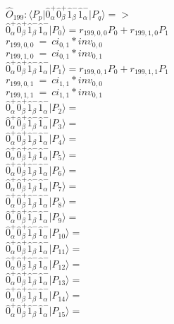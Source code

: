 \documentclass[14pt]{article}
\begin{document}
    $\hat{O}_{199}:  \langle{P_p}\vert \hat{0}_{\alpha}^{+}\hat{0}_{\beta}^{+}\hat{1}_{\beta}^{-}\hat{1}_{\alpha}^{-} \vert{P_q}\rangle => $ \\ 
    $ \hat{0}_{\alpha}^{+}\hat{0}_{\beta}^{+}\hat{1}_{\beta}^{-}\hat{1}_{\alpha}^{-} \vert{P_{0}}\rangle = {r}_{199,0,0}P_{0}+{r}_{199,1,0}P_{1} $ \\ 
    ${r}_{199,0,0}\ =\ {ci}_{0,1}*{inv}_{0,0} $ \\ 
    ${r}_{199,1,0}\ =\ {ci}_{0,1}*{inv}_{0,1} $ \\ 
    $ \hat{0}_{\alpha}^{+}\hat{0}_{\beta}^{+}\hat{1}_{\beta}^{-}\hat{1}_{\alpha}^{-} \vert{P_{1}}\rangle = {r}_{199,0,1}P_{0}+{r}_{199,1,1}P_{1} $ \\ 
    ${r}_{199,0,1}\ =\ {ci}_{1,1}*{inv}_{0,0} $ \\ 
    ${r}_{199,1,1}\ =\ {ci}_{1,1}*{inv}_{0,1} $ \\ 
    $ \hat{0}_{\alpha}^{+}\hat{0}_{\beta}^{+}\hat{1}_{\beta}^{-}\hat{1}_{\alpha}^{-} \vert{P_{2}}\rangle =  $ \\ 
    $ \hat{0}_{\alpha}^{+}\hat{0}_{\beta}^{+}\hat{1}_{\beta}^{-}\hat{1}_{\alpha}^{-} \vert{P_{3}}\rangle =  $ \\ 
    $ \hat{0}_{\alpha}^{+}\hat{0}_{\beta}^{+}\hat{1}_{\beta}^{-}\hat{1}_{\alpha}^{-} \vert{P_{4}}\rangle =  $ \\ 
    $ \hat{0}_{\alpha}^{+}\hat{0}_{\beta}^{+}\hat{1}_{\beta}^{-}\hat{1}_{\alpha}^{-} \vert{P_{5}}\rangle =  $ \\ 
    $ \hat{0}_{\alpha}^{+}\hat{0}_{\beta}^{+}\hat{1}_{\beta}^{-}\hat{1}_{\alpha}^{-} \vert{P_{6}}\rangle =  $ \\ 
    $ \hat{0}_{\alpha}^{+}\hat{0}_{\beta}^{+}\hat{1}_{\beta}^{-}\hat{1}_{\alpha}^{-} \vert{P_{7}}\rangle =  $ \\ 
    $ \hat{0}_{\alpha}^{+}\hat{0}_{\beta}^{+}\hat{1}_{\beta}^{-}\hat{1}_{\alpha}^{-} \vert{P_{8}}\rangle =  $ \\ 
    $ \hat{0}_{\alpha}^{+}\hat{0}_{\beta}^{+}\hat{1}_{\beta}^{-}\hat{1}_{\alpha}^{-} \vert{P_{9}}\rangle =  $ \\ 
    $ \hat{0}_{\alpha}^{+}\hat{0}_{\beta}^{+}\hat{1}_{\beta}^{-}\hat{1}_{\alpha}^{-} \vert{P_{10}}\rangle =  $ \\ 
    $ \hat{0}_{\alpha}^{+}\hat{0}_{\beta}^{+}\hat{1}_{\beta}^{-}\hat{1}_{\alpha}^{-} \vert{P_{11}}\rangle =  $ \\ 
    $ \hat{0}_{\alpha}^{+}\hat{0}_{\beta}^{+}\hat{1}_{\beta}^{-}\hat{1}_{\alpha}^{-} \vert{P_{12}}\rangle =  $ \\ 
    $ \hat{0}_{\alpha}^{+}\hat{0}_{\beta}^{+}\hat{1}_{\beta}^{-}\hat{1}_{\alpha}^{-} \vert{P_{13}}\rangle =  $ \\ 
    $ \hat{0}_{\alpha}^{+}\hat{0}_{\beta}^{+}\hat{1}_{\beta}^{-}\hat{1}_{\alpha}^{-} \vert{P_{14}}\rangle =  $ \\ 
    $ \hat{0}_{\alpha}^{+}\hat{0}_{\beta}^{+}\hat{1}_{\beta}^{-}\hat{1}_{\alpha}^{-} \vert{P_{15}}\rangle =  $ \\ 
    
\end{document}
